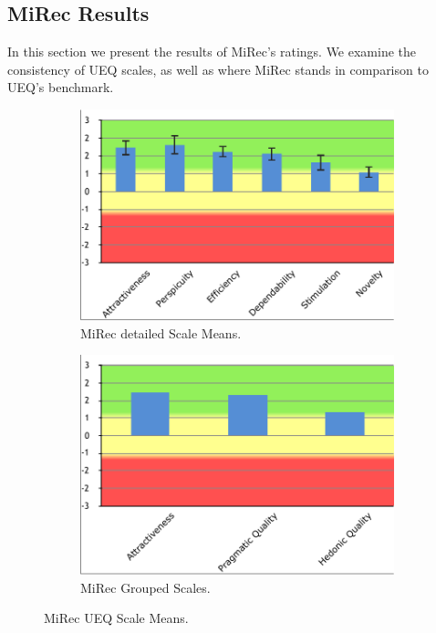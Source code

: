\subsection{MiRec Results}
In this section we present the results of MiRec's ratings. We
examine the consistency of UEQ scales, as well as where MiRec stands in
comparison to UEQ's benchmark.
\begin{figure}[!htbp] 
\centering
\begin{subfigure}[b]{0.45\textwidth} 
\includegraphics[width=\textwidth]{figures/mirec-results}
\caption{MiRec detailed Scale Means.} 
\label{fig:figure54b}
\end{subfigure}
\begin{subfigure}[b]{0.45\textwidth}
\includegraphics[width=\textwidth]{figures/mirec-results2}
\caption{MiRec Grouped Scales.}
\label{fig:figure54a}
\end{subfigure}
\caption{MiRec UEQ Scale Means.}
\label{fig:figure54}
\end{figure}
